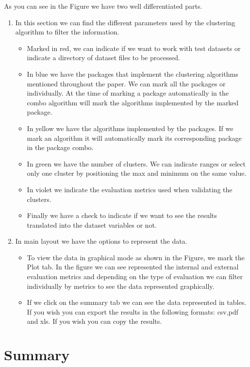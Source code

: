 As you can see in the Figure we have two well differentiated parts.
\begin{enumerate}
  \item In this section we can find the different parameters used by the clustering algorithm to filter the information.
  \begin{itemize}
  \item Marked in red, we can indicate if we want to work with test datasets or indicate a directory of dataset files to be processed.
  \item In blue we have the packages that implement the clustering algorithms mentioned throughout the paper. We can mark all the packages or individually. At the time of marking a package automatically in the combo algorithm will mark the algorithms implemented by the marked package.
  \item In yellow we have the algorithms implemented by the packages. If we mark an algorithm it will automatically mark its corresponding package in the package combo.
  \item In green we have the number of clusters. We can indicate ranges or select only one cluster by positioning the max and minimum on the same value.
  \item In violet we indicate the evaluation metrics used when validating the clusters.
  \item Finally we have a check to indicate if we want to see the results translated into the dataset variables or not.
\end{itemize}
  \item In main layout we have the options to represent the data.
  \begin{itemize}
  \item To view the data in graphical mode as shown in the Figure, we mark the Plot tab. In the figure we can see represented the internal and external evaluation metrics and depending on the type of evaluation we can filter individually by metrics to see the data represented graphically.
  \item If we click on the summary tab we can see the data represented in tables. If you wish you can export the results in the following formats: csv,pdf and xls. If you wish you can copy the results.
\end{itemize}


\end{enumerate}

\section{Summary}

